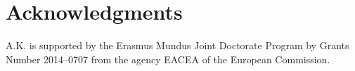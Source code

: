 \section*{Acknowledgments}
A.K. is supported by the Erasmus Mundus Joint Doctorate Program by Grants Number 2014--0707 from the agency EACEA of the European Commission.